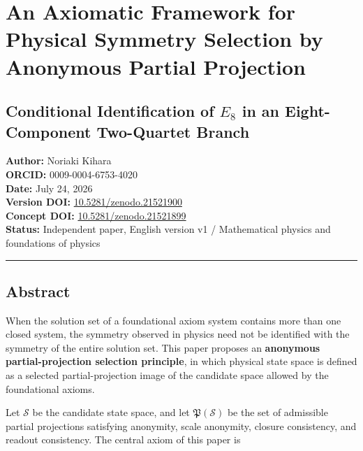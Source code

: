 \documentclass[
  a4paper,
]{article}
\author{}
\date{}
\begin{document}
\section{An Axiomatic Framework for Physical Symmetry Selection by
Anonymous Partial
Projection}\label{an-axiomatic-framework-for-physical-symmetry-selection-by-anonymous-partial-projection}

\subsection{\texorpdfstring{Conditional Identification of \(E_8\) in an
Eight-Component Two-Quartet
Branch}{Conditional Identification of E\_8 in an Eight-Component Two-Quartet Branch}}\label{conditional-identification-of-e_8-in-an-eight-component-two-quartet-branch}

\textbf{Author:} Noriaki Kihara\\
\textbf{ORCID:} 0009-0004-6753-4020\\
\textbf{Date:} July 24, 2026\\
\textbf{Version DOI:}
\href{https://doi.org/10.5281/zenodo.21521900}{10.5281/zenodo.21521900}\\
\textbf{Concept DOI:}
\href{https://doi.org/10.5281/zenodo.21521899}{10.5281/zenodo.21521899}\\
\textbf{Status:} Independent paper, English version v1 / Mathematical
physics and foundations of physics

\begin{center}\rule{0.5\linewidth}{0.5pt}\end{center}

\subsection{Abstract}\label{abstract}

When the solution set of a foundational axiom system contains more than
one closed system, the symmetry observed in physics need not be
identified with the symmetry of the entire solution set. This paper
proposes an \textbf{anonymous partial-projection selection principle},
in which physical state space is defined as a selected
partial-projection image of the candidate space allowed by the
foundational axioms.

Let \(\mathscr S\) be the candidate state space, and let
\(\mathfrak P(\mathscr S)\) be the set of admissible partial projections
satisfying anonymity, scale anonymity, closure consistency, and readout
consistency. The central axiom of this paper is
\end{document}
